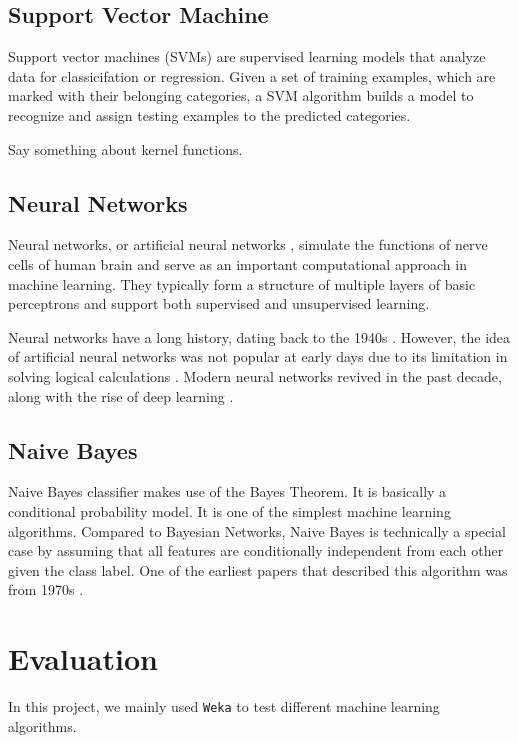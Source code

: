 \documentclass[11pt]{article}
\begin{document}
\subsection{Support Vector Machine}
Support vector machines (SVMs) \cite{cortes1995support} are supervised learning models that analyze data for classicifation or regression. Given a set of training examples, which are marked with their belonging categories, a SVM algorithm builds a model to recognize and assign testing examples to the predicted categories. 

Say something about kernel functions.

\subsection{Neural Networks}
Neural networks, or artificial neural networks \cite{hagan1996neural}, simulate the functions of nerve cells of human brain and serve as an important computational approach in machine learning. They typically form a structure of multiple layers of basic perceptrons and support both supervised and unsupervised learning.

Neural networks have a long history, dating back to the 1940s \cite{mcculloch1943logical}. However, the idea of artificial neural networks was not popular at early days due to its limitation in solving logical calculations \cite{minsky1988perceptrons}. Modern neural networks revived in the past decade, along with the rise of deep learning \cite{bengio2009learning, schmidhuber2015deep}.

\subsection{Naive Bayes}
Naive Bayes classifier makes use of the Bayes Theorem. It is basically a conditional probability model. It is one of the simplest machine learning algorithms. Compared to Bayesian Networks, Naive Bayes is technically a special case by assuming that all features are conditionally independent from each other given the class label. One of the earliest papers that described this algorithm was from 1970s \cite{duda1973pattern}. 

\section{Evaluation}
In this project, we mainly used \texttt{Weka} \cite{hall2009weka} to test different machine learning algorithms.
\end{document}
